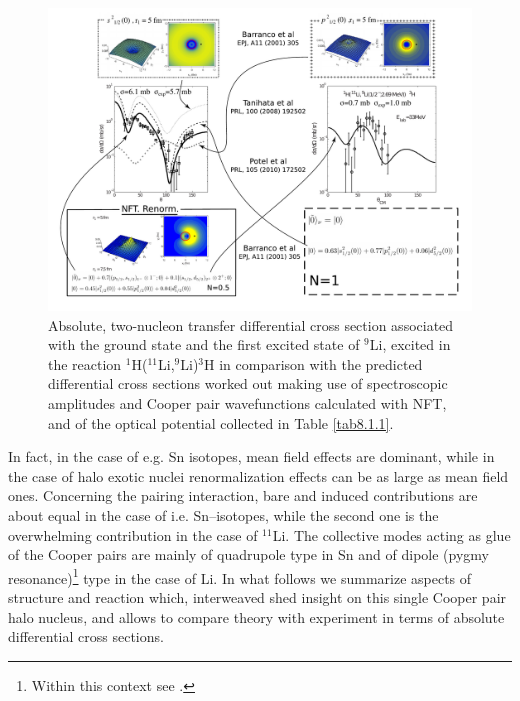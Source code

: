   \begin{figure}
  \centerline{\includegraphics*[width=18cm,angle=0]{C8/figsC8/fig8_1_3}}
  	\caption{Absolute, two-nucleon transfer differential cross section associated with the ground state and the first 	excited state of $^9$Li, excited  in the reaction $^1$H($^{11}$Li,$^9$Li)$^3$H \citep{Tanihata:08} in comparison with the predicted differential cross sections \citep{Potel:10} worked out making use of spectroscopic amplitudes and Cooper pair wavefunctions calculated with NFT, and of the optical potential collected in Table \ref{tab8.1.1}.}\label{fig8_1_2}
  \end{figure}
 In fact, in the case of e.g. Sn isotopes, mean field effects are dominant, while in the case of halo exotic nuclei renormalization effects can be as large as mean field ones. Concerning the pairing interaction, bare and induced contributions are about equal in the case of i.e. Sn--isotopes, while the second one is the overwhelming contribution in the case of $^{11}$Li. The collective modes acting as glue of the Cooper pairs are mainly of quadrupole type in Sn and of dipole (pygmy resonance)\footnote{Within this context see \cite{Broglia:19}.} type in the case of Li. In what follows we summarize aspects of structure and reaction which, interweaved shed insight on this single Cooper pair halo nucleus, and allows to compare theory with experiment in terms of absolute differential cross sections.

 
 
 
 
 
 

